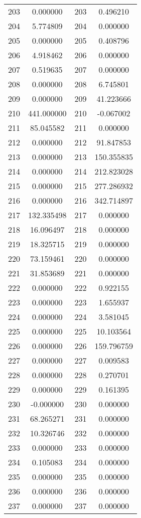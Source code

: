 \documentclass[12pt]{article}
\begin{document}
\begin{longtable}{@{}cccc@{}}
203 & 0.000000 & 203 & 0.496210 \\
204 & 5.774809 & 204 & 0.000000 \\
205 & 0.000000 & 205 & 0.408796 \\
206 & 4.918462 & 206 & 0.000000 \\
207 & 0.519635 & 207 & 0.000000 \\
208 & 0.000000 & 208 & 6.745801 \\
209 & 0.000000 & 209 & 41.223666 \\
210 & 441.000000 & 210 & -0.067002 \\
211 & 85.045582 & 211 & 0.000000 \\
212 & 0.000000 & 212 & 91.847853 \\
213 & 0.000000 & 213 & 150.355835 \\
214 & 0.000000 & 214 & 212.823028 \\
215 & 0.000000 & 215 & 277.286932 \\
216 & 0.000000 & 216 & 342.714897 \\
217 & 132.335498 & 217 & 0.000000 \\
218 & 16.096497 & 218 & 0.000000 \\
219 & 18.325715 & 219 & 0.000000 \\
220 & 73.159461 & 220 & 0.000000 \\
221 & 31.853689 & 221 & 0.000000 \\
222 & 0.000000 & 222 & 0.922155 \\
223 & 0.000000 & 223 & 1.655937 \\
224 & 0.000000 & 224 & 3.581045 \\
225 & 0.000000 & 225 & 10.103564 \\
226 & 0.000000 & 226 & 159.796759 \\
227 & 0.000000 & 227 & 0.009583 \\
228 & 0.000000 & 228 & 0.270701 \\
229 & 0.000000 & 229 & 0.161395 \\
230 & -0.000000 & 230 & 0.000000 \\
231 & 68.265271 & 231 & 0.000000 \\
232 & 10.326746 & 232 & 0.000000 \\
233 & 0.000000 & 233 & 0.000000 \\
234 & 0.105083 & 234 & 0.000000 \\
235 & 0.000000 & 235 & 0.000000 \\
236 & 0.000000 & 236 & 0.000000 \\
237 & 0.000000 & 237 & 0.000000 \\

\end{longtable}
\end{document}
